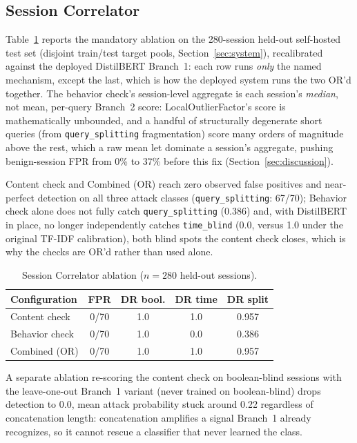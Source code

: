 \documentclass[conference]{IEEEtran}
\begin{document}
\subsection{Session Correlator}
Table~\ref{tab:b3} reports the mandatory ablation on the 280-session held-out self-hosted test set (disjoint train/test target pools, Section~\ref{sec:system}), recalibrated against the deployed DistilBERT Branch~1: each row runs \emph{only} the named mechanism, except the last, which is how the deployed system runs the two OR'd together. The behavior check's session-level aggregate is each session's \emph{median}, not mean, per-query Branch~2 score: LocalOutlierFactor's score is mathematically unbounded, and a handful of structurally degenerate short queries (from \texttt{query\_splitting} fragmentation) score many orders of magnitude above the rest, which a raw mean let dominate a session's aggregate, pushing benign-session FPR from 0\% to 37\% before this fix (Section~\ref{sec:discussion}).

Content check and Combined (OR) reach zero observed false positives and near-perfect detection on all three attack classes (\texttt{query\_splitting}: 67/70); Behavior check alone does not fully catch \texttt{query\_splitting} (0.386) and, with DistilBERT in place, no longer independently catches \texttt{time\_blind} (0.0, versus 1.0 under the original TF-IDF calibration), both blind spots the content check closes, which is why the checks are OR'd rather than used alone.

\begin{table}[t]
\caption{Session Correlator ablation ($n=280$ held-out sessions).}
\label{tab:b3}
\begin{center}
\begin{tabular}{@{}lcccc@{}}
\toprule
\textbf{Configuration} & \textbf{FPR} & \textbf{DR bool.} & \textbf{DR time} & \textbf{DR split} \\
\midrule
Content check  & 0/70 & 1.0 & 1.0 & 0.957 \\
Behavior check & 0/70 & 1.0 & 0.0 & 0.386 \\
Combined (OR)  & 0/70 & 1.0 & 1.0 & 0.957 \\
\bottomrule
\end{tabular}
\end{center}
\end{table}

A separate ablation re-scoring the content check on boolean-blind sessions with the leave-one-out Branch~1 variant (never trained on boolean-blind) drops detection to 0.0, mean attack probability stuck around 0.22 regardless of concatenation length: concatenation amplifies a signal Branch~1 already recognizes, so it cannot rescue a classifier that never learned the class.
\end{document}
